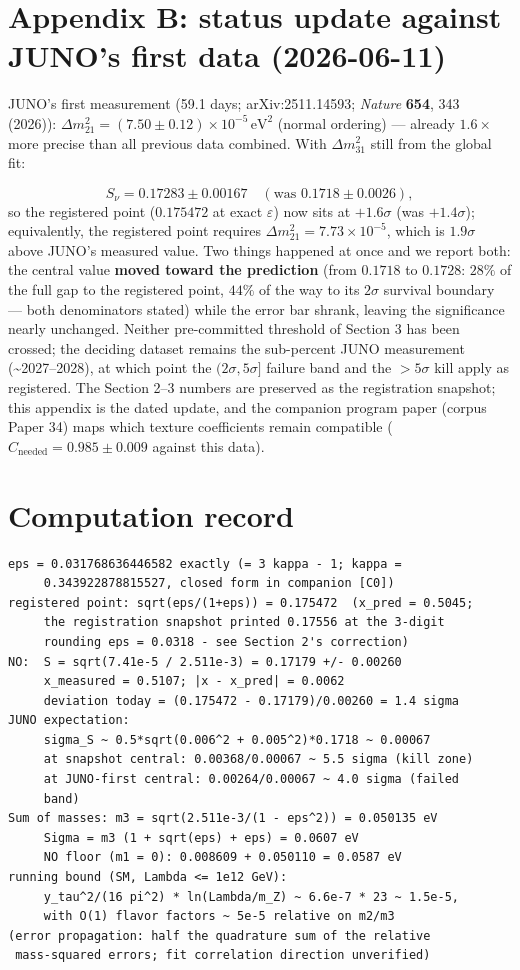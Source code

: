 \documentclass[11pt]{article}
\begin{document}
\section*{Appendix B: status update against JUNO's first data (2026-06-11)}
JUNO's first measurement (59.1 days; arXiv:2511.14593; \emph{Nature} \textbf{654}, 343 (2026)): $\Delta m^2_{21} = (7.50 \pm 0.12)\times 10^{-5}\,\mathrm{eV}^2$ (normal ordering) — already $1.6\times$ more precise than all previous data combined.  With $\Delta m^2_{31}$ still from the global fit:

\[
S_\nu = 0.17283 \pm 0.00167 \quad (\text{was } 0.1718 \pm 0.0026),
\]
so the registered point ($0.175472$ at exact $\varepsilon$) now sits at $+1.6\sigma$ (was $+1.4\sigma$); equivalently, the registered point requires $\Delta m^2_{21} = 7.73\times 10^{-5}$, which is $1.9\sigma$ above JUNO's measured value.  Two things happened at once and we report both: the central value \textbf{moved toward the prediction} (from $0.1718$ to $0.1728$: $28\%$ of the full gap to the registered point, $44\%$ of the way to its $2\sigma$ survival boundary — both denominators stated) while the error bar shrank, leaving the significance nearly unchanged.  Neither pre-committed threshold of Section 3 has been crossed; the deciding dataset remains the sub-percent JUNO measurement (\textasciitilde{}2027–2028), at which point the $(2\sigma, 5\sigma]$ failure band and the $>5\sigma$ kill apply as registered.  The Section 2–3 numbers are preserved as the registration snapshot; this appendix is the dated update, and the companion program paper (corpus Paper 34) maps which texture coefficients remain compatible ($C_{\mathrm{needed}} = 0.985 \pm 0.009$ against this data).

\section*{Computation record}
\begin{small}\begin{verbatim}
eps = 0.031768636446582 exactly (= 3 kappa - 1; kappa =
     0.343922878815527, closed form in companion [C0])
registered point: sqrt(eps/(1+eps)) = 0.175472  (x_pred = 0.5045;
     the registration snapshot printed 0.17556 at the 3-digit
     rounding eps = 0.0318 - see Section 2's correction)
NO:  S = sqrt(7.41e-5 / 2.511e-3) = 0.17179 +/- 0.00260
     x_measured = 0.5107; |x - x_pred| = 0.0062
     deviation today = (0.175472 - 0.17179)/0.00260 = 1.4 sigma
JUNO expectation:
     sigma_S ~ 0.5*sqrt(0.006^2 + 0.005^2)*0.1718 ~ 0.00067
     at snapshot central: 0.00368/0.00067 ~ 5.5 sigma (kill zone)
     at JUNO-first central: 0.00264/0.00067 ~ 4.0 sigma (failed
     band)
Sum of masses: m3 = sqrt(2.511e-3/(1 - eps^2)) = 0.050135 eV
     Sigma = m3 (1 + sqrt(eps) + eps) = 0.0607 eV
     NO floor (m1 = 0): 0.008609 + 0.050110 = 0.0587 eV
running bound (SM, Lambda <= 1e12 GeV):
     y_tau^2/(16 pi^2) * ln(Lambda/m_Z) ~ 6.6e-7 * 23 ~ 1.5e-5,
     with O(1) flavor factors ~ 5e-5 relative on m2/m3
(error propagation: half the quadrature sum of the relative
 mass-squared errors; fit correlation direction unverified)
\end{verbatim}\end{small}
\end{document}

